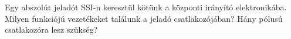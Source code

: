 \begin{example}

Egy abszolút jeladót SSI-n keresztül kötünk a központi irányító elektronikába. Milyen funkciójú vezetékeket találunk a jeladó csatlakozójában? Hány pólusú csatlakozóra lesz szükség?

\tcbline
\vspace{1mm}

\solution

\end{example}